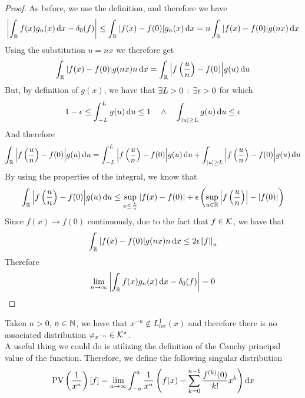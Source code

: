 \documentclass[../complete.tex]{subfiles}
\begin{document}
\begin{proof}
	As before, we use the definition, and therefore we have
	\begin{equation*}
		\abs{\int_{\mathbb{R}}^{}f(x)g_n(x)\operatorname{d\!} x-\delta_0(f)}\le\int_{\mathbb{R}}^{}\abs{f(x)-f(0)}g_n(x)\operatorname{d\!} x=n\int_{\mathbb{R}}^{}\abs{f(x)-f(0)}g(nx)\operatorname{d\!} x
	\end{equation*}
	Using the substitution $u=nx$ we therefore get
	\begin{equation*}
		\int_{\mathbb{R}}^{}\abs{f(x)-f(0)}g(nx)n\operatorname{d\!} x=\int_{\mathbb{R}}^{}\abs{f\left( \frac{u}{n} \right)-f(0)}g(u)\operatorname{d\!} u
	\end{equation*}
	But, by definition of $g(x)$, we have that $\exists L>0\, :\, \exists\epsilon>0$ for which
	\begin{equation*}
		1-\epsilon\le\int_{-L}^{L}g(u)\operatorname{d\!} u\le1\quad\wedge\quad\int_{\abs{u}\ge L}^{}g(u)\operatorname{d\!} u\le\epsilon
	\end{equation*}
	And therefore
	\begin{equation*}
		\int_{\mathbb{R}}^{}\abs{f\left( \frac{u}{n} \right)-f(0)}g(u)\operatorname{d\!} u=\int_{-L}^{L}\abs{f\left( \frac{u}{n} \right)-f(0)}g(u)\operatorname{d\!} u+\int_{\abs{u}\ge L}^{}\abs{f\left( \frac{u}{n} \right)-f(0)}g(u)\operatorname{d\!} u
	\end{equation*}
	By using the properties of the integral, we know that
	\begin{equation*}
		\int_{\mathbb{R}}^{}\abs{f\left( \frac{u}{n} \right)-f(0)}g(u)\operatorname{d\!} u\le\sup_{x\le\frac{L}{n}}\abs{f(x)-f(0)}+\epsilon\left( \sup_{u\in\mathbb{R}}\abs{f\left( \frac{u}{n} \right)}-\abs{f(0)} \right)
	\end{equation*}
	Since $f(x)\to f(0)$ continuously, due to the fact that $f\in\mathcal{K}$, we have that
	\begin{equation*}
		\int_{\mathbb{R}}^{}\abs{f(x)-f(0)}g(nx)n\operatorname{d\!} x\le2\epsilon\norm{f}_u
	\end{equation*}
	Therefore
	\begin{equation*}
		\lim_{n\to\infty}\abs{\int_{\mathbb{R}}^{}f(x)g_n(x)\operatorname{d\!} x-\delta_0(f)}=0
	\end{equation*}
\end{proof}
\begin{dfn}
	Taken $n>0$, $n\in\mathbb{N}$, we have that $x^{-n}\notin L^1_{loc}(x)$ and therefore there is no associated distribution $\varphi_{x^{-n}}\in\mathcal{K}^\star$.\\
	A useful thing we could do is utilizing the definition of the Cauchy principal value of the function. Therefore, we define the following singular distribution
	\begin{equation}
		\operatorname{\mathrm{PV}}\left( \frac{1}{x^n} \right)[f]=\lim_{a\to\infty}\int_{-a}^{a}\frac{1}{x^n}\left( f(x)-\sum_{k=0}^{n-1}\frac{f^{(k)}(0)}{k!}x^k \right)\operatorname{d\!} x
		\label{eq:cpvdist}
	\end{equation}
\end{dfn}
\end{document}

